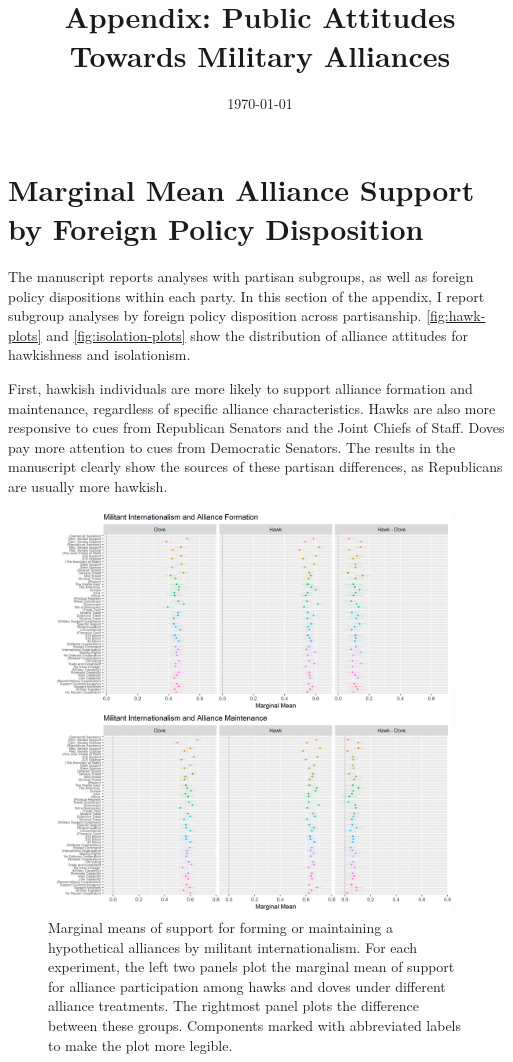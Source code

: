 \documentclass[12pt]{article}
\title{\textbf{Appendix: Public Attitudes Towards Military Alliances}}
\author{}
\date{\today}
\begin{document}
\maketitle 

\doublespace 




\section{Marginal Mean Alliance Support by Foreign Policy Disposition} 


The manuscript reports analyses with partisan subgroups, as well as foreign policy dispositions within each party. 
In this section of the appendix, I report subgroup analyses by foreign policy disposition across partisanship. 
\autoref{fig:hawk-plots} and \autoref{fig:isolation-plots} show the distribution of alliance attitudes for hawkishness and isolationism. 


First, hawkish individuals are more likely to support alliance formation and maintenance, regardless of specific alliance characteristics. 
Hawks are also more responsive to cues from Republican Senators and the Joint Chiefs of Staff. 
Doves pay more attention to cues from Democratic Senators.
The results in the manuscript clearly show the sources of these partisan differences, as Republicans are usually more hawkish. 


\begin{figure}
	\centering
		\includegraphics[width=0.95\textwidth]{hawk-plots.png}
	\caption{Marginal means of support for forming or maintaining a hypothetical alliances by militant internationalism. For each experiment, the left two panels plot the marginal mean of support for alliance participation among hawks and doves under different alliance treatments. The rightmost panel plots the difference between these groups. Components marked with abbreviated labels to make the plot more legible.}
	\label{fig:hawk-plots}
\end{figure}
\end{document}
